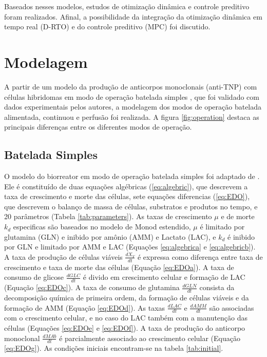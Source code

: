 \documentclass[fleqn,10pt]{SelfArx} %
\begin{document}
Baseados nesses modelos, estudos de otimização dinâmica e controle preditivo foram realizados. Afinal, a possibilidade da integração da otimização dinâmica em tempo real (D-RTO) e do controle preditivo (MPC) foi discutido. 

\section{Modelagem}
A partir de um modelo da produção de anticorpos monoclonais (anti-TNP) com células hibridomas em modo de operação batelada simples \cite{Alves2008}, que foi validado com dados experimentais pelos autores, a modelagem dos modos de operação batelada alimentada, continuou e perfusão foi realizada. A figura \ref{fig:operation} destaca as principais diferenças entre os diferentes modos de operação.
\subsection{Batelada Simples}
O modelo do biorreator em modo de operação batelada simples foi adaptado de \cite{Alves2008}. Ele é constituído de duas equações algébricas (\ref{eq:algebric}), que descrevem a taxa de crescimento e morte das células, sete equações diferencias (\ref{eq:EDO}), que descrevem o balanço de massa de células, substratos e produtos no tempo, e 20 parâmetros (Tabela \ref{tab:parameters}). As taxas de crescimento $\mu$ e de morte $k_d$ especificas são baseados no modelo de Monod estendido, $\mu$ é limitado por glutamina (GLN) e inibido por amônio (AMM) e Lactato (LAC), e $k_d$ é inibido por GLN e limitado por AMM e LAC (Equações \ref{eq:algebrica} e \ref{eq:algebricb}).
A taxa de produção de células viáveis $\frac{dX_V}{dt}$ é expressa como diferença entre taxa de crescimento e taxa de morte das células (Equação \ref{eq:EDOa}). A taxa de consumo de glicose $\frac{dGLC}{dt}$ é divido em crescimento celular e formação de LAC (Equação \ref{eq:EDOc}). A taxa de consumo de glutamina $\frac{dGLN}{dt}$ consista da decomposição química de primeira ordem, da formação de células viáveis e da formação de AMM (Equação \ref{eq:EDOd}). As taxas $\frac{dLAC}{dt}$ e $\frac{dAMM}{dt}$ são associadas com o crescimento celular, e no caso do LAC também com a manutenção das células (Equações \ref{eq:EDOe} e \ref{eq:EDOf}). A taxa de produção do anticorpo monoclonal $\frac{dMAb}{dt}$ é parcialmente associado ao crescimento celular (Equação \ref{eq:EDOg}). As condições iniciais encontram-se na tabela \ref{tab:initial}.
\end{document}
